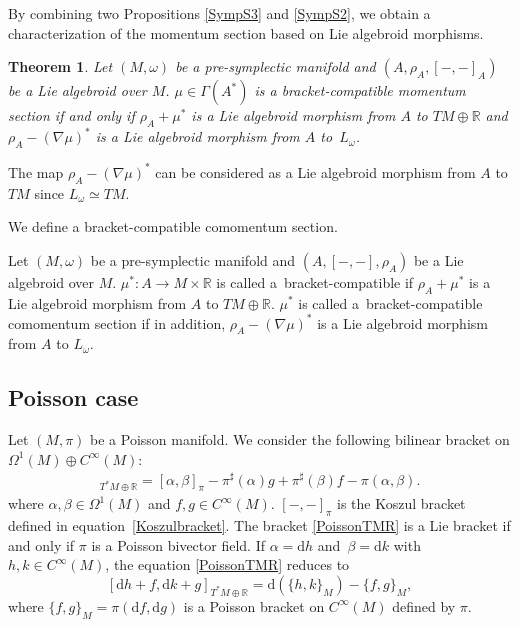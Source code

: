 \documentclass[pdftex]{sigma}
\numberwithin{equation}{section}
\newtheorem{Theorem}{Theorem}[section]
\def\bR{{\mathbb{R}}}
\newcommand{\sbv}[2]{{\{{{#1},{#2}}\}}}
\newcommand{\rhoa}{{\rho_A}}
\newcommand{\rd}{\mathrm{d}}
\begin{document}
By combining two Propositions \ref{SympS3} and \ref{SympS2}, we obtain a characterization of the momentum section based on Lie algebroid morphisms.
\begin{Theorem}
Let $(M, \omega)$ be a pre-symplectic manifold and $(A, \rhoa, [-,-]_A)$ be a Lie algebroid over $M$.
$\mu \in \Gamma(A^*)$ is a bracket-compatible momentum section
if and only if $\rhoa + \mu^*$ is a Lie algebroid morphism from
$A$ to $TM \oplus \bR$ and
$\rhoa - (\nabla \mu)^*$ is a Lie algebroid morphism
from $A$ to~$L_{\omega}$.
\end{Theorem}
The map $\rhoa - (\nabla \mu)^*$ can be considered as a Lie algebroid morphism from $A$ to $TM$ since $L_{\omega} \simeq TM$.

We define a bracket-compatible comomentum section.
\begin{Definition}\label{comomSymp}
Let $(M, \omega)$ be a pre-symplectic manifold
and $(A, [-,-], \rhoa)$ be a Lie algebroid over $M$.
$\mu^*\colon A \rightarrow M \times \bR$ is called a~bracket-compatible
if $\rhoa + \mu^*$ is a Lie algebroid morphism from
$A$ to $TM \oplus \bR$.
$\mu^*$ is called a~bracket-compatible comomentum section if in addition,
$\rhoa - (\nabla \mu)^*$ is a Lie algebroid morphism
from $A$ to $L_{\omega}$.
\end{Definition}

\subsection{Poisson case}\label{PoisLAM}

Let $(M, \pi)$ be a Poisson manifold.
We consider the following bilinear bracket on
$\Omega^1(M) \oplus C^{\infty}(M)$:
\begin{gather}
[\alpha + f, \beta + g]_{T^*M \oplus \bR} =
[\alpha, \beta]_{\pi} - \pi^{\sharp}(\alpha) g
+ \pi^{\sharp}(\beta) f - \pi(\alpha, \beta).
\label{PoissonTMR}
\end{gather}
where $\alpha, \beta \in \Omega^1(M)$ and $f, g \in C^{\infty}(M)$.
$[-,-]_{\pi}$ is the Koszul bracket defined in equation~\eqref{Koszulbracket}.
The bracket \eqref{PoissonTMR} is a Lie bracket if and only if $\pi$ is a Poisson bivector field.
If $\alpha = \rd h$ and~${\beta = \rd k}$ with $h, k \in C^{\infty}(M)$,
the equation \eqref{PoissonTMR} reduces to
\[%
[\rd h + f, \rd k + g]_{T^*M \oplus \bR} =
\rd (\sbv{h}{k}_{M}) - \sbv{f}{g}_{M},
\]
where $\sbv{f}{g}_{M} = \pi(\rd f, \rd g)$ is a Poisson bracket on $C^{\infty}(M)$ defined by $\pi$.
\end{document}
